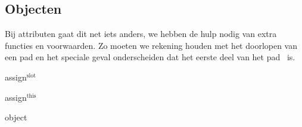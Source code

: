 \subsection{Objecten}

Bij attributen gaat dit net iets anders, we hebben de hulp nodig van extra functies en voorwaarden. Zo moeten we rekening houden met het doorlopen van een pad en het speciale geval onderscheiden dat het eerste deel van het pad \THIS\ is.

\begin{NSAxiom}{assign$^\text{slot}$}
  \begin{prooftree}
  \end{prooftree}
  \begin{NSConditions}
  \end{NSConditions}
\end{NSAxiom}

\begin{NSAxiom}{assign$^\text{this}$}
  \begin{prooftree}
  \end{prooftree}
  \begin{NSConditions}
  \end{NSConditions}
\end{NSAxiom}

\begin{NSAxiom}{object}
  \begin{prooftree}
  \end{prooftree}
  \begin{NSConditions}
  \end{NSConditions}
\end{NSAxiom}

